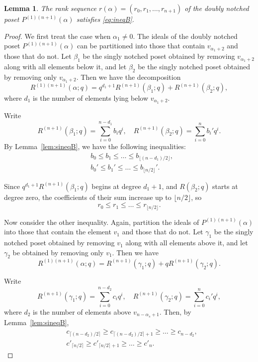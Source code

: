 \documentclass{article}
\newtheorem{lemma}{Lemma}
\theoremstyle{remark}
\begin{document}
\begin{lemma}\label{lem:doublyeqb}
    The rank sequence \( r(\alpha) = (r_{0}, r_{1}, \ldots, r_{n+1}) \) of the doubly notched poset $P^{(1)(n+1)}(\alpha)$ satisfies \eqref{eq:ineqB}.
\end{lemma}
\begin{proof}
We first treat the case when \( \alpha_1\neq 0 \). The ideals of the doubly notched poset \( P^{(1)(n+1)}(\alpha) \) can be partitioned into those that contain \( v_{\alpha_1+2} \) and those that do not. Let \( \beta_1 \) be the singly notched poset obtained by removing \( v_{\alpha_1+2} \) along with all elements below it, and let \( \beta_2 \) be the singly notched poset obtained by removing only \( v_{\alpha_1+2} \). Then we have the decomposition
\[
R^{(1)(n+1)}(\alpha; q) = q^{d_1 + 1} R^{(n+1)}(\beta_1; q) + R^{(n+1)}(\beta_2; q),
\]
where \( d_1 \) is the number of elements lying below \( v_{\alpha_1+2} \).

Write
\[
R^{(n+1)}(\beta_1; q) = \sum_{i=0}^{n - d_1} b_i q^i, \quad R^{(n+1)}(\beta_2; q) = \sum_{i=0}^{n} b_i' q^i.
\]
By Lemma~\ref{lem:sineqB}, we have the following inequalities:
\begin{align*}
    &b_0 \le b_1 \le \dots \le b_{\lfloor (n - d_1)/2 \rfloor}, \\
    &b_0' \le b_1' \le \dots \le b_{\lfloor n/2 \rfloor}'.
\end{align*}

Since \( q^{d_1 + 1} R^{(n+1)}(\beta_1; q) \) begins at degree \( d_1 + 1 \), and \( R(\beta_2; q) \) starts at degree zero, the coefficients of their sum increase up to \( \lfloor n/2 \rfloor \), so
\[
r_0 \le r_1 \le \dots \le r_{\lfloor n/2 \rfloor}.
\]

Now consider the other inequality. Again, partition the ideals of \( P^{(1)(n+1)}(\alpha) \) into those that contain the element \( v_{1} \) and those that do not. Let \( \gamma_1 \) be the singly notched poset obtained by removing \( v_{1} \) along with all elements above it, and let \( \gamma_2 \) be obtained by removing only \( v_{1} \). Then we have
\[
R^{(1)(n+1)}(\alpha; q) = R^{(n+1)}(\gamma_1; q) + q R^{(n+1)}(\gamma_2; q).
\]

Write
\[
R^{(n+1)}(\gamma_1; q) = \sum_{i=0}^{n - d_2} c_i q^i, \quad R^{(n+1)}(\gamma_2; q) = \sum_{i=0}^{n} c_i' q^i,
\]
where \( d_2 \) is the number of elements above \( v_{n - \alpha_s + 1} \). Then, by Lemma~\ref{lem:sineqB},
\begin{align*}
    &c_{\lceil (n - d_2)/2 \rceil} \ge c_{\lceil (n - d_2)/2 \rceil + 1} \ge \dots \ge c_{n - d_2}, \\
    &c'_{\lceil n/2 \rceil} \ge c'_{\lceil n/2 \rceil + 1} \ge \dots \ge c'_n.
\end{align*}


\end{proof}
\end{document}
